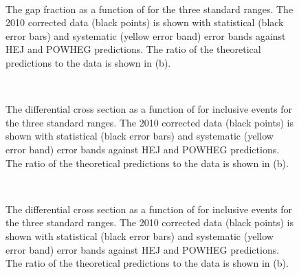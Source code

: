 \begin{figure}
\centering
\mbox{
              \quad
              \quad
                              }
\caption[]{
The gap fraction as a function of \qz{} for the three standard \dy{} ranges.  
The 2010 corrected data (black points) is shown with statistical (black error bars) and systematic (yellow error band) error bands against HEJ and POWHEG predictions.
The ratio of the theoretical predictions to the data is shown in (b).
\label{GBJ2:FinalPlots:Q0}}
\end{figure}

\begin{figure}
\centering
\mbox{
              \quad
              \quad
                              }
\caption[]{
The differential cross section as a function of \dphi{} for inclusive events for the three standard \dy{} ranges.  
The 2010 corrected data (black points) is shown with statistical (black error bars) and systematic (yellow error band) error bands against HEJ and POWHEG predictions.
The ratio of the theoretical predictions to the data is shown in (b).
\label{GBJ2:FinalPlots:dPhi_Incl}}
\end{figure}

\begin{figure}
\centering
\mbox{
              \quad
              \quad
                              }
\caption[]{
The differential cross section as a function of \dphi{} for inclusive events for the three standard \dy{} ranges.  
The 2010 corrected data (black points) is shown with statistical (black error bars) and systematic (yellow error band) error bands against HEJ and POWHEG predictions.
The ratio of the theoretical predictions to the data is shown in (b).
\label{GBJ2:FinalPlots:dPhi_Gap}}
\end{figure}


